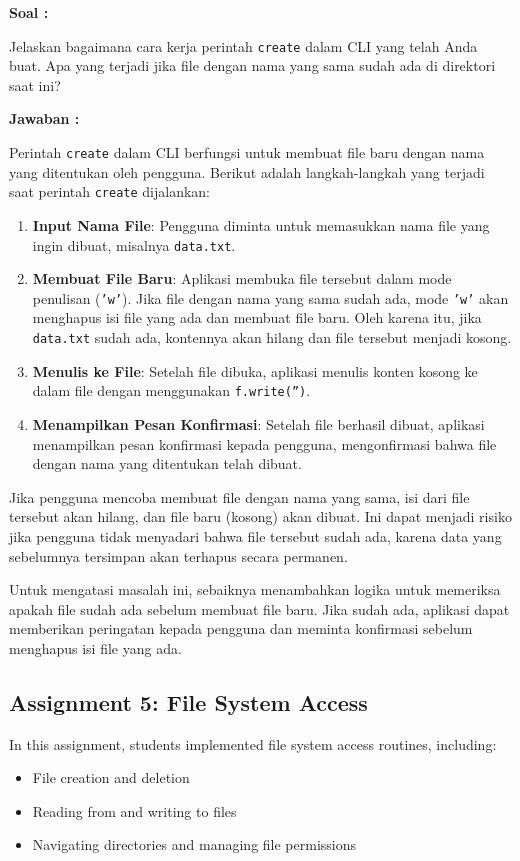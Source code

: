 \documentclass[12pt]{article}
\begin{document}
\textbf{Soal : }

Jelaskan bagaimana cara kerja perintah \texttt{create} dalam CLI yang telah Anda buat. Apa yang terjadi jika file dengan nama yang sama sudah ada di direktori saat ini?

\textbf{Jawaban : }

Perintah \texttt{create} dalam CLI berfungsi untuk membuat file baru dengan nama yang ditentukan oleh pengguna. Berikut adalah langkah-langkah yang terjadi saat perintah \texttt{create} dijalankan:

\begin{enumerate}
    \item \textbf{Input Nama File}: Pengguna diminta untuk memasukkan nama file yang ingin dibuat, misalnya \texttt{data.txt}.
    \item \textbf{Membuat File Baru}: Aplikasi membuka file tersebut dalam mode penulisan (\texttt{'w'}). Jika file dengan nama yang sama sudah ada, mode \texttt{'w'} akan menghapus isi file yang ada dan membuat file baru. Oleh karena itu, jika \texttt{data.txt} sudah ada, kontennya akan hilang dan file tersebut menjadi kosong.
    \item \textbf{Menulis ke File}: Setelah file dibuka, aplikasi menulis konten kosong ke dalam file dengan menggunakan \texttt{f.write('')}.
    \item \textbf{Menampilkan Pesan Konfirmasi}: Setelah file berhasil dibuat, aplikasi menampilkan pesan konfirmasi kepada pengguna, mengonfirmasi bahwa file dengan nama yang ditentukan telah dibuat.
\end{enumerate}

Jika pengguna mencoba membuat file dengan nama yang sama, isi dari file tersebut akan hilang, dan file baru (kosong) akan dibuat. Ini dapat menjadi risiko jika pengguna tidak menyadari bahwa file tersebut sudah ada, karena data yang sebelumnya tersimpan akan terhapus secara permanen.

Untuk mengatasi masalah ini, sebaiknya menambahkan logika untuk memeriksa apakah file sudah ada sebelum membuat file baru. Jika sudah ada, aplikasi dapat memberikan peringatan kepada pengguna dan meminta konfirmasi sebelum menghapus isi file yang ada.

\subsection{Assignment 5: File System Access}
In this assignment, students implemented file system access routines, including:
\begin{itemize}
    \item File creation and deletion
    \item Reading from and writing to files
    \item Navigating directories and managing file permissions
\end{itemize}
\end{document}

